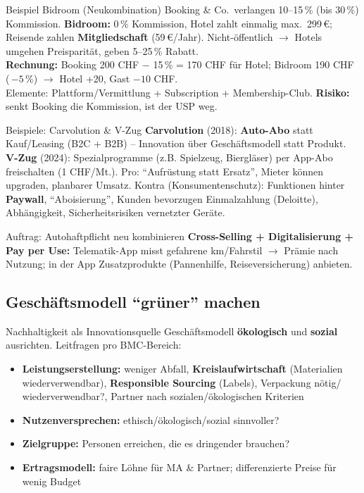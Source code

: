\documentclass[a4paper, fontsize=7pt]{scrartcl}
\begin{document}
\begin{subbox}{Beispiel Bidroom (Neukombination)}
Booking \& Co.\ verlangen 10--15\,\% (bis 30\,\%) Kommission.
\textbf{Bidroom:} 0\,\% Kommission, Hotel zahlt einmalig max.\ 299\,€;
Reisende zahlen \textbf{Mitgliedschaft} (59\,€/Jahr). Nicht-öffentlich
$\to$ Hotels umgehen Preisparität, geben 5--25\,\% Rabatt.\\
\textbf{Rechnung:} Booking 200 CHF $-$ 15\,\% = 170 CHF für Hotel;
Bidroom 190 CHF (\,$-5$\,\%) $\to$ Hotel +20, Gast $-10$ CHF.\\
Elemente: Plattform/Vermittlung + Subscription + Membership-Club.
\textbf{Risiko:} senkt Booking die Kommission, ist der USP weg.
\end{subbox}

\begin{subbox}{Beispiele: Carvolution \& V-Zug}
\textbf{Carvolution} (2018): \textbf{Auto-Abo} statt Kauf/Leasing (B2C +
B2B) -- Innovation über Geschäftsmodell statt Produkt.\\
\textbf{V-Zug} (2024): Spezialprogramme (z.B. Spielzeug, Biergläser) per
App-Abo freischalten (1 CHF/Mt.). Pro: ``Aufrüstung statt
Ersatz'', Mieter können upgraden, planbarer Umsatz. Kontra
(Konsumentenschutz): Funktionen hinter \textbf{Paywall}, ``Aboisierung'',
Kunden bevorzugen Einmalzahlung (Deloitte), Abhängigkeit,
Sicherheitsrisiken vernetzter Geräte.
\end{subbox}

\begin{subbox}{Auftrag: Autohaftpflicht neu kombinieren}
\textbf{Cross-Selling + Digitalisierung + Pay per Use:} Telematik-App
misst gefahrene km/Fahrstil $\to$ Prämie nach Nutzung; in der App
Zusatzprodukte (Pannenhilfe, Reiseversicherung) anbieten.
\end{subbox}

\subsection{Geschäftsmodell ``grüner'' machen}

\begin{mainbox}{Nachhaltigkeit als Innovationsquelle}
Geschäftsmodell \textbf{ökologisch} und \textbf{sozial} ausrichten. Leitfragen
pro BMC-Bereich:
\begin{itemize}
    \item \textbf{Leistungserstellung:} weniger Abfall,
    \textbf{Kreislaufwirtschaft} (Materialien wiederverwendbar),
    \textbf{Responsible Sourcing} (Labels), Verpackung nötig/
    wiederverwendbar?, Partner nach sozialen/ökologischen Kriterien
    \item \textbf{Nutzenversprechen:} ethisch/ökologisch/sozial sinnvoller?
    \item \textbf{Zielgruppe:} Personen erreichen, die es dringender brauchen?
    \item \textbf{Ertragsmodell:} faire Löhne für MA \& Partner;
    differenzierte Preise für wenig Budget
\end{itemize}
\end{mainbox}
\end{document}

